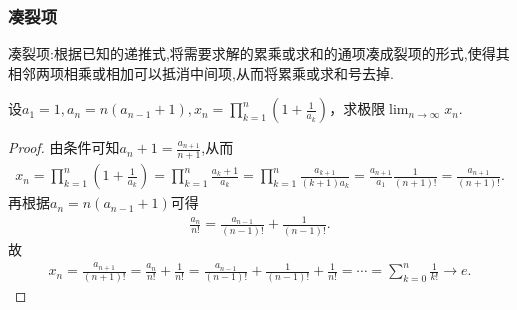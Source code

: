 \documentclass[../../main.tex]{subfiles}%
\begin{document}
\subsubsection{凑裂项}

凑裂项:根据已知的递推式,将需要求解的累乘或求和的通项凑成裂项的形式,使得其相邻两项相乘或相加可以抵消中间项,从而将累乘或求和号去掉.

\begin{example}
设\(a_1 = 1,a_n = n(a_{n - 1}+1),x_n=\prod_{k = 1}^{n}\left(1+\frac{1}{a_k}\right)\)，求极限\(\lim_{n\rightarrow\infty}x_n\).
\end{example}
\begin{proof}
由条件可知$a_n+1=\frac{a_{n+1}}{n+1}$,从而
\begin{align*}
x_n=\prod_{k=1}^n{\left( 1+\frac{1}{a_k} \right)}=\prod_{k=1}^n{\frac{a_k+1}{a_k}}=\prod_{k=1}^n{\frac{a_{k+1}}{(k+1)a_k}}=\frac{a_{n+1}}{a_1}\frac{1}{(n+1)!}=\frac{a_{n+1}}{(n+1)!}.
\end{align*}
再根据$a_n=n(a_{n-1}+1)$可得
\begin{align*}
\frac{a_n}{n!}=\frac{a_{n-1}}{(n-1)!}+\frac{1}{(n-1)!}.
\end{align*}
故
\begin{align*}
x_n=\frac{a_{n+1}}{(n+1)!}=\frac{a_n}{n!}+\frac{1}{n!}=\frac{a_{n-1}}{(n-1)!}+\frac{1}{(n-1)!}+\frac{1}{n!}=\cdots =\sum_{k=0}^n{\frac{1}{k!}\rightarrow e.}
\end{align*}
\end{proof}
\end{document}

